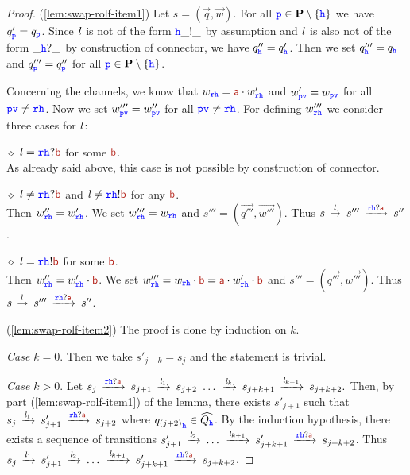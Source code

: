 \begin{proof}
(\ref{lem:swap-rolf-item1})
%
 Let $s = (\vec{q},\vec{w})$.
 For all $\ttp \in \roles\setminus\{\hh\}$ we have $q'_\ttp = q_\ttp$.
 Since $\elle$ is not of the form $\HH\_!\_$ by assumption and
$\elle$ is also not of the form $\_\HH?\_$ by construction of connector, 
we have $q''_\HH = q'_\HH$. 
Then we set $q'''_\HH = q_\HH$ and $q'''_\ttp = q''_\ttp$ for all
$\ttp \in \roles\setminus\{\hh\}$.

Concerning the channels, we know that $w_{\ttr\HH} =  \msg[a]\cdot w'_{\ttr\HH}$ and $w'_{\ttp\ttv} =  w_{\ttp\ttv}$ for all
$\ttp\ttv \neq \ttr\HH$. 
Now we set $w'''_{\ttp\ttv} =  w''_{\ttp\ttv}$ for all $\ttp\ttv \neq \ttr\HH$. 
For defining $w'''_{\ttr\HH}$ we consider three cases for $\elle$: 
%
\begin{description}
\item \underline{$\diamond$}
$\elle = \ttr\HH?\msg[b]$ for some $\msg[b]$.\\
As already said above, this case is not possible by construction of connector.

\item \underline{$\diamond$}
$\elle \neq \ttr\HH?\msg[b]$ and $\elle \neq \ttr\HH!\msg[b]$
for any $\msg[b]$.\\
Then $w''_{\ttr\HH} =  w'_{\ttr\HH}$. We set
$w'''_{\ttr\HH} = w_{\ttr\HH}$ and $s''' = (\vec{q'''},\vec{w'''})$. 
Thus $s\lts{\elle}s'''\lts{\ttr\HH?\msg[a]}s''$. 
%
\item
\underline{$\diamond$}
$\elle = \ttr\HH!\msg[b]$ for some $\msg[b]$.\\
Then $w''_{\ttr\HH} = w'_{\ttr\HH}\cdot\msg[b]$.
We set $w'''_{\ttr\HH} = w_{\ttr\HH}\cdot\msg[b] = \msg[a]\cdot w'_{\ttr\HH}\cdot\msg[b]$ and $s''' = (\vec{q'''},\vec{w'''})$.
Thus $s\lts{\elle}s'''\lts{\ttr\HH?\msg[a]}s''$. 
\end{description}

(\ref{lem:swap-rolf-item2}) The proof is done by induction on $k$.

{\em Case $k = 0$}.
Then we take $s'_{j+k} = s_j$ and the statement is trivial. 

{\em Case $k>0$}. %
Let $s_j  \lts{\ttr\HH?\msg[a]} s_{j+1}\lts{\elle_1}s_{j+2}\,\,\ldots\, \lts{\elle_{k}}s_{j+k+1} \lts{\elle_{k+1}}s_{j+k+2}.$
Then, by part (\ref{lem:swap-rolf-item1}) of the lemma, there exists
$s'_{j+1}$ such that $s_j \lts{\elle_1} s'_{j+1}\lts{\ttr\HH?\msg[a]}s_{j+2}$
where ${q_{(j+2)}}_\hh\in \widehat{Q_{\hh}}$.
By the induction hypothesis, there exists a sequence of transitions 
$s'_{j+1}  \lts{\elle_2} \ldots\,  \lts{\elle_{k+1}} s'_{j+k+1} \lts{\ttr\HH?\msg[a]}s_{j+k+2}$. Thus
$s_j \lts{\elle_1} s'_{j+1}  \lts{\elle_2} \ldots\,  \lts{\elle_{k+1}} s'_{j+k+1} \lts{\ttr\HH?\msg[a]}s_{j+k+2}$. 



\end{proof}
